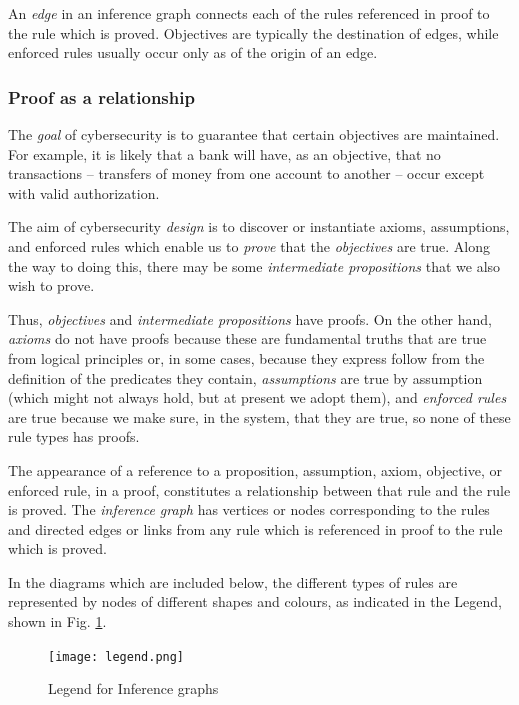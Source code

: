 An {\em edge} in an inference graph connects each of the rules referenced in proof to the rule which is proved. Objectives are typically the destination of edges, while enforced rules usually occur only as of the origin of an edge.

\subsubsection{Proof as a relationship}
The {\em goal} of cybersecurity is to guarantee that certain objectives are maintained. For example, it is likely that a bank will have, as an objective, that no transactions -- transfers of money from one account to another -- occur except with valid authorization.

The aim of cybersecurity {\em design} is to discover or instantiate axioms, assumptions, and enforced rules which enable us to {\em prove} that the {\em objectives} are true. Along the way to doing this, there may be some {\em intermediate propositions} that we also wish to prove.

Thus, {\em objectives} and {\em intermediate propositions} have proofs. On the other hand, {\em axioms} do not have proofs because these are fundamental truths that are true from logical principles or, in some cases, because they express follow from the definition of the predicates they contain, {\em assumptions} are true by assumption (which might not always hold, but at present we adopt them), and {\em enforced rules} are true because we make sure, in the system, that they are true, so none of these rule types has proofs.

The appearance of a reference to a proposition, assumption, axiom, objective, or enforced rule, in a proof,  constitutes a relationship between that rule and the rule is proved. The {\em inference graph} has vertices or nodes corresponding to the rules and directed edges or links from any rule which is referenced in proof to the rule which is proved.


In the diagrams which are included below, the different types of rules are represented by nodes of different shapes and colours, as  indicated in the Legend, shown in Fig. \ref{legend}. \begin{figure}[bhpt]
	\centering
		\leavevmode\texttt{[image: legend.png]}\ \\
		\caption{Legend for Inference graphs}\label{legend}
\end{figure}




